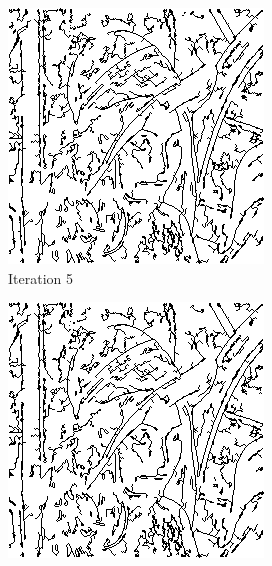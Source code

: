 \documentclass{llncs}
\begin{document}
\begin{figure}
        \begin{subfigure}[b]{0.3\textwidth}
                \includegraphics[width=\textwidth]{IMG/RandomInit/Iteration5}
                \caption{Iteration 5}
                \label{fig:rand_iter5}
        \end{subfigure}%
        \quad
        \begin{subfigure}[b]{0.3\textwidth}
                \includegraphics[width=\textwidth]{IMG/RandomInit/Iteration6}

\end{subfigure}
\end{figure}
\end{document}
